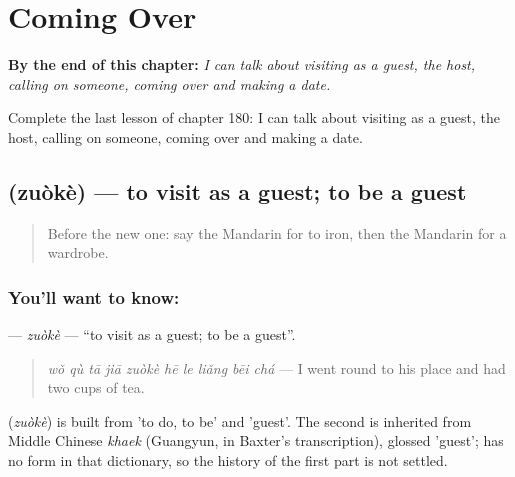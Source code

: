 
\chapter{Coming Over}
\label{ch:zh-coming-over}

\begin{chapteropening}
\textbf{By the end of this chapter:} \emph{I can talk about visiting as a guest, the host, calling on someone, coming over and making a date.}

Complete the last lesson of chapter 180: I can talk about visiting as a guest, the host, calling on someone, coming over and making a date.
\end{chapteropening}

\section[\texorpdfstring{\zh{做客} (zuòkè)}{做客 (zuòkè)}]{ (zuòkè) — to visit as a guest; to be a guest}

\label{lesson:ZH-C180-zuoke}



\begin{quote}
Before the new one: say the Mandarin for to iron, then the Mandarin for a wardrobe.
\end{quote}

\subsection*{You'll want to know: }
\textbf{} — \emph{zuòkè} — \textquotedblleft{}to visit as a guest; to be a guest\textquotedblright{}.

\begin{quote}
\textbf{} \emph{wǒ qù tā jiā zuòkè hē le liǎng bēi chá} — I went round to his place and had two cups of tea.
\end{quote}

\begin{cousinweb}
\textbf{} (\emph{zuòkè}) is built from  'to do, to be' and  'guest'. The second is inherited from Middle Chinese \emph{khaek} (Guangyun, in Baxter's transcription), glossed 'guest';  has no form in that dictionary, so the history of the first part is not settled.
\end{cousinweb}

